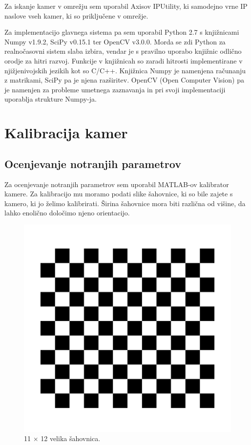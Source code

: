 \documentclass[a4paper, 12pt]{book}
\begin{document}
Za iskanje kamer v omrežju sem uporabil Axisov IPUtility, ki samodejno vrne IP naslove vseh kamer, ki so priključene v omrežje.

Za implementacijo glavnega sistema pa sem uporabil Python 2.7 s knjižnicami Numpy v1.9.2, SciPy v0.15.1 ter OpenCV v3.0.0. Morda se zdi Python za realnočasovni sistem slaba izbira, vendar je s pravilno uporabo knjižnic odlično orodje za hitri razvoj. Funkcije v knjižnicah so zaradi hitrosti implementirane v njižjenivojskih jezikih kot so C/C++. Knjižnica Numpy je namenjena računanju z matrikami, SciPy pa je njena razširitev. OpenCV (Open Computer Vision) pa je namenjen za probleme umetnega zaznavanja in pri svoji implementaciji uporablja strukture Numpy-ja. 
\section{Kalibracija kamer}\label{camcalsec}
\subsection{Ocenjevanje notranjih parametrov}
Za ocenjevanje notranjih parametrov sem uporabil MATLAB-ov kalibrator kamere. Za kalibracijo mu moramo podati slike šahovnice, ki so bile zajete s kamero, ki jo želimo kalibrirati. Širina šahovnice mora biti različna od višine, da lahko enolično določimo njeno orientacijo. 
\begin{figure}[H]
\centering
\includegraphics[scale=0.4]{checkerboard.png}
\caption{11 $\times$ 12 velika šahovnica.}
\end{figure}
\end{document}
